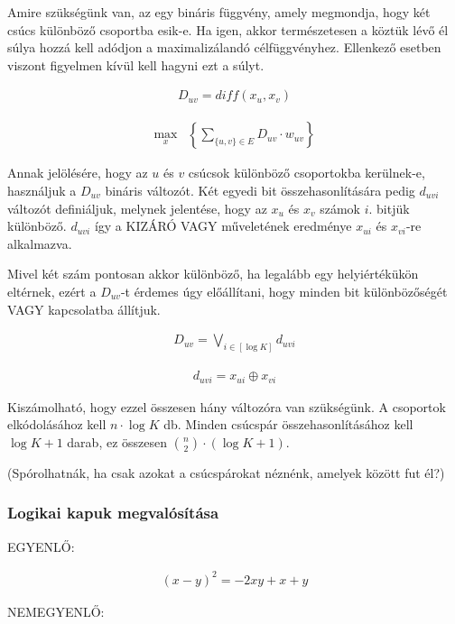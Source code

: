 Amire szükségünk van, az egy bináris függvény, amely megmondja, hogy két csúcs különböző csoportba esik-e. Ha igen, akkor természetesen a köztük lévő él súlya hozzá kell adódjon a maximalizálandó célfüggvényhez. Ellenkező esetben viszont figyelmen kívül kell hagyni ezt a súlyt.

\begin{align}
D_{uv} = diff(x_u,x_v)
\end{align}

\begin{align} 
	\max_{x} & \left\{\sum _{\{u,v\} \in E } D_{uv} \cdot w_{uv} \right\} 
\end{align}


Annak jelölésére, hogy az $u$ és $v$ csúcsok különböző csoportokba kerülnek-e, használjuk a $D_{uv}$ bináris változót. Két egyedi bit összehasonlítására pedig $d_{uvi}$ változót definiáljuk, melynek jelentése, hogy az $x_u$ és $x_v$ számok $i.$ bitjük különböző. $d_{uvi}$ így a KIZÁRÓ VAGY műveletének eredménye $x_{ui}$ és  $x_{vi}$-re alkalmazva.

Mivel két szám pontosan akkor különböző, ha legalább egy helyiértékükön eltérnek, ezért a $D_{uv}$-t érdemes úgy előállítani, hogy minden bit különbözőségét VAGY kapcsolatba állítjuk.

\begin{align}
	D_{uv} = \bigvee_{i \in [ \log K ] }{d_{uvi}}
\end{align}


\begin{align}
	d_{uvi} = x_{ui} \oplus x_{vi}
\end{align}

Kiszámolható, hogy ezzel összesen hány változóra van szükségünk. A csoportok elkódolásához kell $n \cdot \log K$ db. Minden csúcspár összehasonlításához kell $\log K + 1$ darab, ez összesen $\binom{n}{2} \cdot ( \log K + 1 )$.

(Spórolhatnák, ha csak azokat a csúcspárokat néznénk, amelyek között fut él?)

\subsubsection{Logikai kapuk megvalósítása}

EGYENLŐ:

\begin{align}
	(x-y)^2=-2xy+x+y
\end{align}

NEMEGYENLŐ:

